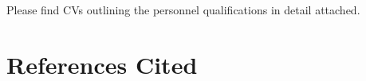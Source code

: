 \documentclass[12pt]{article}
\begin{document}
Please find CVs outlining the personnel qualifications in detail attached.


\newpage
\section{References Cited}

{

}
\end{document}
